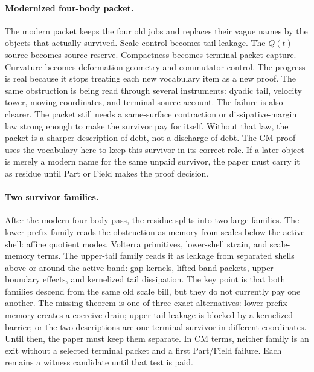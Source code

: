 \paragraph{Modernized four-body packet.}
The modern packet keeps the four old jobs and replaces their vague names by
the objects that actually survived.
Scale control becomes tail leakage.
The \(Q(t)\) source becomes source reserve.
Compactness becomes terminal packet capture.
Curvature becomes deformation geometry and commutator control.
The progress is real because it stops treating each new vocabulary item as a
new proof.
The same obstruction is being read through several instruments: dyadic tail,
velocity tower, moving coordinates, and terminal source account.
The failure is also clearer.
The packet still needs a same-surface contraction or dissipative-margin law strong
enough to make the survivor pay for itself.
Without that law, the packet is a sharper description of debt, not a discharge
of debt.
The CM proof uses the vocabulary here to keep this survivor in its correct
role.
If a later object is merely a modern name for the same unpaid survivor, the
paper must carry it as residue until Part or Field makes the proof
decision.

\paragraph{Two survivor families.}
After the modern four-body pass, the residue splits into two large families.
The lower-prefix family reads the obstruction as memory from scales below the
active shell: affine quotient modes, Volterra primitives, lower-shell strain,
and scale-memory terms.
The upper-tail family reads it as leakage from separated shells above or around
the active band: gap kernels, lifted-band packets, upper boundary effects, and
kernelized tail dissipation.
The key point is that both families descend from the same old scale bill, but
they do not currently pay one another.
The missing theorem is one of three exact alternatives: lower-prefix memory
creates a coercive drain; upper-tail leakage is blocked by a kernelized barrier;
or the two descriptions are one terminal survivor in different coordinates.
Until then, the paper must keep them separate.
In CM terms, neither family is an exit without a selected terminal packet and a
first Part/Field failure.
Each remains a witness candidate until that test is paid.

